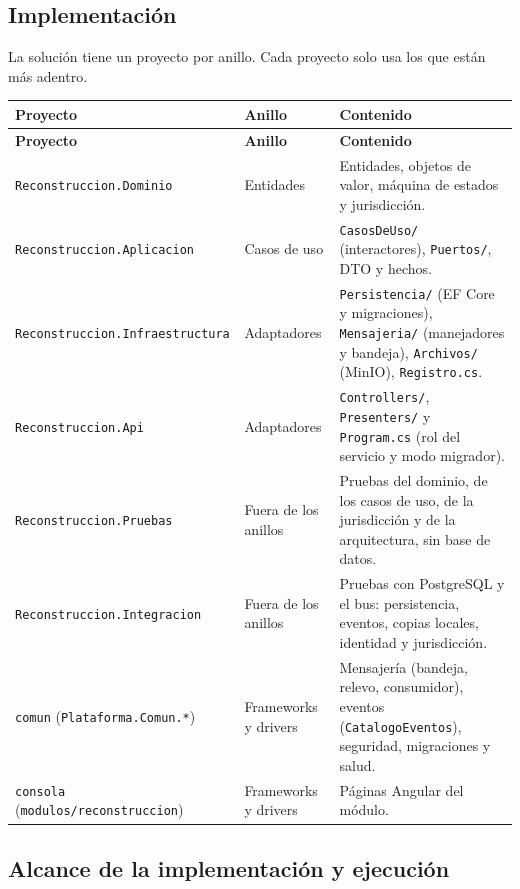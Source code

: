 \documentclass[11pt,a4paper]{article}
\begin{document}
\clearpage
\subsection{Implementación}
\label{sec:implementacion}

La solución tiene un proyecto por anillo. Cada proyecto solo usa los que están más adentro.

{\small
\begin{longtable}{|P{4.8cm}|P{3.0cm}|P{6.8cm}|}
  \hline
  \textbf{Proyecto} & \textbf{Anillo} & \textbf{Contenido} \\ \hline
  \endfirsthead
  \hline
  \textbf{Proyecto} & \textbf{Anillo} & \textbf{Contenido} \\ \hline
  \endhead
  \texttt{Reconstruccion.\allowbreak Dominio} & Entidades & Entidades, objetos de valor, máquina de estados y jurisdicción. \\
    \hline
  \texttt{Reconstruccion.\allowbreak Aplicacion} & Casos de uso & \texttt{CasosDeUso/} (interactores), \texttt{Puertos/},
    DTO y hechos. \\ \hline
  \texttt{Reconstruccion.\allowbreak Infraestructura} & Adaptadores & \texttt{Persistencia/} (EF Core y migraciones),
    \texttt{Mensajeria/} (manejadores y bandeja), \texttt{Archivos/} (MinIO), \texttt{Registro.cs}. \\ \hline
  \texttt{Reconstruccion.\allowbreak Api} & Adaptadores & \texttt{Controllers/}, \texttt{Presenters/} y
    \texttt{Program.cs} (rol del servicio y modo migrador). \\ \hline
  \texttt{Reconstruccion.\allowbreak Pruebas} & Fuera de los anillos & Pruebas del dominio, de los casos de uso, de la
    jurisdicción y de la arquitectura, sin base de datos. \\ \hline
  \texttt{Reconstruccion.\allowbreak Integracion} & Fuera de los anillos & Pruebas con PostgreSQL y el bus: persistencia,
    eventos, copias locales, identidad y jurisdicción. \\ \hline
  \texttt{comun} (\texttt{Plataforma.Comun.*}) & Frameworks y drivers & Mensajería (bandeja, relevo, consumidor),
    eventos (\texttt{CatalogoEventos}), seguridad, migraciones y salud. \\ \hline
  \texttt{consola} (\texttt{modulos/reconstruccion}) & Frameworks y drivers & Páginas Angular del módulo. \\ \hline
\end{longtable}
}

\subsection{Alcance de la implementación y ejecución}
\end{document}
